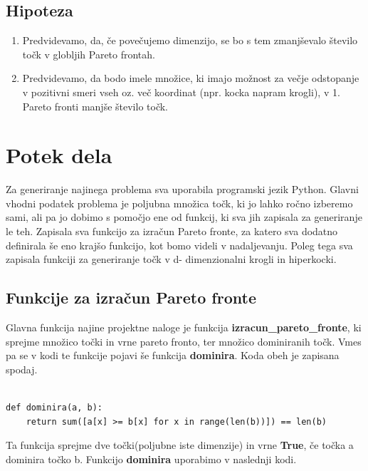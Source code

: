 \documentclass{article}
\begin{document}
\subsection{Hipoteza}
\begin{enumerate}
    \item Predvidevamo, da, če povečujemo dimenzijo, se bo s tem zmanjševalo število točk v globljih Pareto frontah.
    \item Predvidevamo, da bodo imele množice, ki imajo možnost za večje odstopanje v pozitivni smeri vseh oz. več koordinat (npr. kocka napram krogli), v 1. Pareto fronti manjše število točk.
\end{enumerate}

\section{Potek dela}
Za generiranje najinega problema sva uporabila programski jezik Python. Glavni vhodni podatek problema je poljubna množica točk, ki jo lahko ročno izberemo sami, ali pa jo dobimo s pomočjo ene od funkcij, ki sva jih zapisala za generiranje le teh. Zapisala sva funkcijo za izračun Pareto fronte, za katero sva dodatno definirala še eno krajšo funkcijo, kot bomo videli v nadaljevanju. Poleg tega sva zapisala funkciji za generiranje točk v d- dimenzionalni krogli in hiperkocki.

\subsection{Funkcije za izračun Pareto fronte}

Glavna funkcija najine projektne naloge je funkcija \textbf{izracun\_pareto\_fronte}, ki sprejme množico točki in vrne pareto fronto, ter množico dominiranih točk. Vmes pa se v kodi te funkcije pojavi še funkcija \textbf{dominira}. Koda obeh je zapisana spodaj.

\begin{verbatim}

def dominira(a, b):
    return sum([a[x] >= b[x] for x in range(len(b))]) == len(b)
\end{verbatim}

Ta funkcija sprejme dve točki(poljubne iste dimenzije) in vrne \textbf{True}, če točka a dominira točko b. Funkcijo \textbf{dominira} uporabimo v naslednji kodi.
\end{document}
